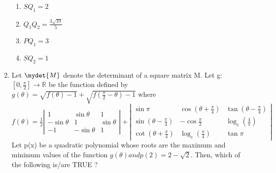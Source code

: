 \documentclass{article}
\begin{document}
\begin{enumerate}
\begin{enumerate}[label=\Alph*.]
	\item $SQ_1=2$
	\item $Q_1Q_2=\frac{3\sqrt{10}}{5}$
	\item $PQ_1=3$
	\item $SQ_2=1$
\end{enumerate}

	\item Let $\mydet{M}$ denote the determinant of a square matrix M. Let g:$[0,\frac{\pi}{2}]\to\mathbb{R}$  be the function defined by\\
		$g(\theta)=\sqrt{f(\theta)-1}+\sqrt{f(\frac{\pi}{2}-\theta)-1}$ where\\
		$f(\theta) = \frac{1}{2} \left| \begin{matrix}
1 & \sin \theta & 1 \\
-\sin \theta & 1 & \sin \theta \\
-1 & -\sin \theta & 1
\end{matrix} \right| + \left| \begin{matrix}
	\sin \pi & \cos \left( \theta + \frac{\pi}{4} \right) & \tan \left( \theta - \frac{\pi}{4} \right) \\
			\sin \left( \theta - \frac{\pi}{4} \right) & - \cos \frac{\pi}{2} & \log_e \left( \frac{4}{\pi} \right) \\
			\cot \left( \theta + \frac{\pi}{4} \right)& \log_e \left( \frac{\pi}{4} \right) & \tan \pi
\end{matrix} \right|$\\
Let p(x) be a quadratic polynomial whose roots are the maximum and minimum values of the function $g(\theta)and p(2) = 2 -\sqrt{2}$. Then, which of the following is/are TRUE ?\\


\end{enumerate}
\end{document}

